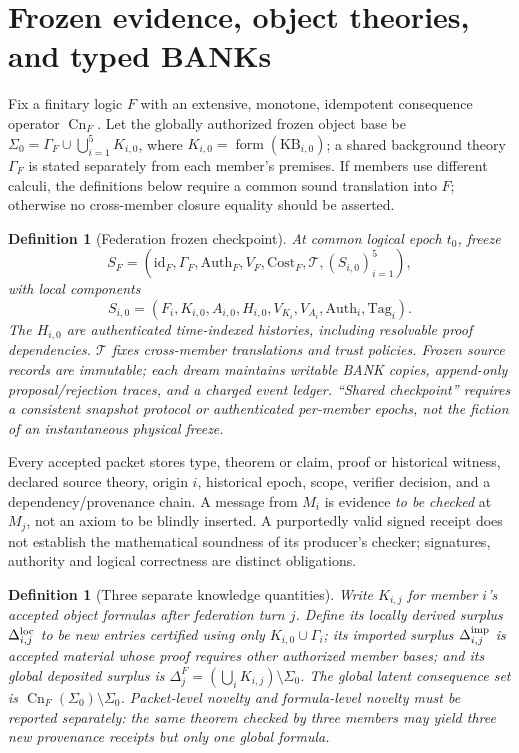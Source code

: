 \documentclass[11pt]{article}
\newtheorem{definition}[theorem]{Definition}
\newcommand{\Cn}{\operatorname{Cn}}
\newcommand{\KB}{\mathrm{KB}}
\newcommand{\Auth}{\mathrm{Auth}}
\newcommand{\Cost}{\mathrm{Cost}}
\begin{document}
\section{Frozen evidence, object theories, and typed BANKs}
Fix a finitary logic $F$ with an extensive, monotone, idempotent consequence operator $\Cn_F$. Let the globally authorized frozen object base be $\Sigma_0=\Gamma_F\cup\bigcup_{i=1}^5 K_{i,0}$, where $K_{i,0}=\operatorname{form}(\KB_{i,0})$; a shared background theory $\Gamma_F$ is stated separately from each member's premises. If members use different calculi, the definitions below require a common sound translation into $F$; otherwise no cross-member closure equality should be asserted.
\begin{definition}[Federation frozen checkpoint]
At common logical epoch $t_0$, freeze\[S_F=(\mathrm{id}_F,\Gamma_F,\Auth_F,V_F,\Cost_F,\mathcal T,(S_{i,0})_{i=1}^5),\]with local components\[S_{i,0}=(F_i,K_{i,0},A_{i,0},H_{i,0},V_{K_i},V_{A_i},\Auth_i,\mathrm{Tag}_i).\] The $H_{i,0}$ are authenticated time-indexed histories, including resolvable proof dependencies. $\mathcal T$ fixes cross-member translations and trust policies. Frozen source records are immutable; each dream maintains writable BANK copies, append-only proposal/rejection traces, and a charged event ledger. ``Shared checkpoint'' requires a consistent snapshot protocol or authenticated per-member epochs, not the fiction of an instantaneous physical freeze.
\end{definition}
Every accepted packet stores type, theorem or claim, proof or historical witness, declared source theory, origin $i$, historical epoch, scope, verifier decision, and a dependency/provenance chain. A message from $M_i$ is evidence \emph{to be checked} at $M_j$, not an axiom to be blindly inserted. A purportedly valid signed receipt does not establish the mathematical soundness of its producer's checker; signatures, authority and logical correctness are distinct obligations.
\begin{definition}[Three separate knowledge quantities]
Write $K_{i,j}$ for member $i$'s accepted object formulas after federation turn $j$. Define its \emph{locally derived surplus} $\Delta^{\rm loc}_{i,j}$ to be new entries certified using only $K_{i,0}\cup\Gamma_i$; its \emph{imported surplus} $\Delta^{\rm imp}_{i,j}$ is accepted material whose proof requires other authorized member bases; and its \emph{global deposited surplus} is $\Delta^F_j=(\bigcup_i K_{i,j})\setminus\Sigma_0$. The global \emph{latent} consequence set is $\Cn_F(\Sigma_0)\setminus\Sigma_0$. Packet-level novelty and formula-level novelty must be reported separately: the same theorem checked by three members may yield three new provenance receipts but only one global formula.
\end{definition}
\end{document}
